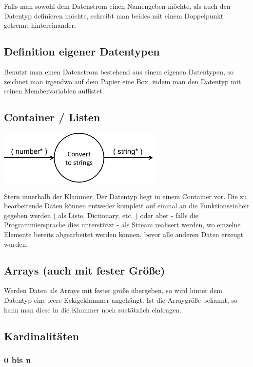 \documentclass[11pt]{article}
\begin{document}
Falls man sowohl dem Datenstrom einen Namengeben möchte, als auch den Datentyp definieren möchte, schreibt man beides mit einem
Doppelpunkt getrennt hintereinander.
\subsection{Definition eigener Datentypen}
\label{sec:orgheadline6}
Benutzt man einen Datenstrom bestehend aus einem eigenen Datentypen, so zeichnet man irgendwo auf dem Papier eine Box,
indem man den Datentyp mit seinen Membervariablen auflistet.
\subsection{Container / Listen}
\label{sec:orgheadline7}

\includegraphics[width=.9\linewidth]{./img/diagramCollection.png}

Stern innerhalb der Klammer.
Der Datentyp liegt in einem Container vor. 
Die zu bearbeitende Daten können entweder komplett auf einmal an die Funktionseinheit gegeben werden ( als Liste, Dictionary, etc. )
oder aber - falls die Programmiersprache dies unterstützt - als Stream realisert werden, wo einzelne Elemente bereits abgearbeitet werden
können, bevor alle anderen Daten erzeugt wurden.

\subsection{Arrays (auch mit fester Größe)}
\label{sec:orgheadline8}
Werden Daten als Arrays mit fester größe übergeben, so wird hinter dem Datentyp eine leere Eckigeklammer angehängt.
Ist die Arraygröße bekannt, so kann man diese in die Klammer noch zustätzlich eintragen.
\subsection{Kardinalitäten}
\label{sec:orgheadline11}
\subsubsection{0 bis n}
\label{sec:orgheadline9}
\end{document}
